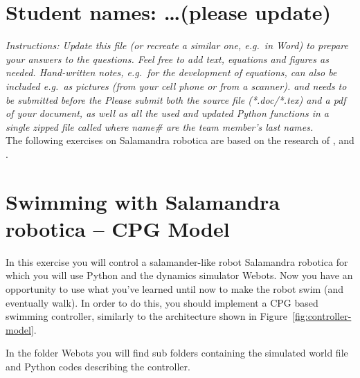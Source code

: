\documentclass{cmc}
\begin{document}
\pagestyle{fancy}
 

\section*{Student names: \ldots (please update)}

\textit{Instructions: Update this file (or recreate a similar one, e.g.\ in
  Word) to prepare your answers to the questions. Feel free to add text,
  equations and figures as needed. Hand-written notes, e.g.\ for the development
  of equations, can also be included e.g.\ as pictures (from your cell phone or
  from a scanner).  \textbf{} and needs to be
  submitted before the \textbf{} Please submit both the source
  file (*.doc/*.tex) and a pdf of your document, as well as all the used and
  updated Python functions in a single zipped file called
   where name\# are the team
  member’s last names.  }
\\

The following exercises on Salamandra robotica are based
on the research of \cite{Crespi2013}, \cite{Karakasiliotis2013} and
\cite{ijspeert2007swimming}.

\section*{Swimming with Salamandra robotica – CPG Model}
\label{sec:exploring-swimming}

In this exercise you will control a salamander-like robot Salamandra
robotica for which you will use Python and the dynamics simulator
Webots. Now you have an opportunity to use what you’ve learned until
now to make the robot swim (and eventually walk). In order to do this,
you should implement a CPG based swimming controller, similarly to the
architecture shown in Figure~\ref{fig:controller-model}.

In the folder Webots you will find sub folders containing the simulated
world file and Python codes describing the controller.
\end{document}

